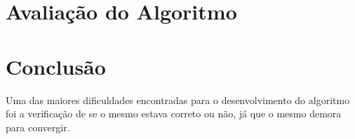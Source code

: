 \documentclass[letterpaper]{article}
\begin{document}
\section{Avaliação do Algoritmo}

\section{Conclusão}

Uma das maiores dificuldades encontradas para o desenvolvimento do algoritmo foi a verificação de se o mesmo estava correto ou não, já que o mesmo
demora para convergir.
\end{document}

